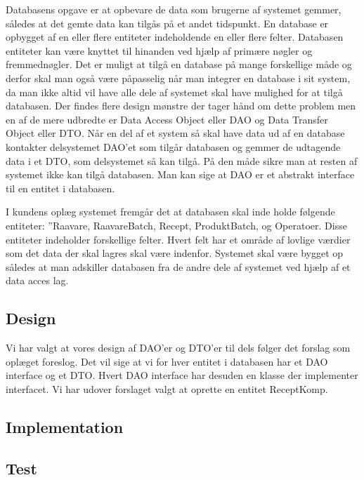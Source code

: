 \documentclass[a4paper]{article}
\begin{document}
Databasens opgave er at opbevare de data som brugerne af systemet gemmer, således at det gemte data kan tilgås på et andet tidspunkt. En database er opbygget af en eller flere entiteter indeholdende en eller flere felter. Databasen entiteter kan være knyttet til hinanden ved hjælp af primære nøgler og fremmednøgler. Det er muligt at tilgå en database på mange forskellige måde og derfor skal man også være påpasselig når man integrer en database i sit system, da man ikke altid vil have alle dele af systemet skal have mulighed for at tilgå databasen. Der findes flere design mønstre der tager hånd om dette problem men en af de mere udbredte er Data Access Object eller DAO og Data Transfer Object eller DTO. Når en del af et system så skal have data ud af en database kontakter delsystemet DAO’et som tilgår databasen og gemmer de udtagende data i et DTO, som delsystemet så kan tilgå. På den måde sikre man at resten af systemet ikke kan tilgå databasen. Man kan sige at DAO er et abstrakt interface til en entitet i databasen.

I kundens oplæg systemet fremgår det at databasen skal inde holde følgende entiteter: ”Raavare, RaavareBatch, Recept, ProduktBatch, og Operatoer. Disse entiteter indeholder forskellige felter. Hvert felt har et område af lovlige værdier som det data der skal lagres skal være indenfor.
Systemet skal være bygget op således at man adskiller databasen fra de andre dele af systemet ved hjælp af et data acces lag.



\subsection{Design} %

Vi har valgt at vores design af DAO’er og DTO’er til dels følger det forslag som oplæget foreslog. Det vil sige at vi for hver entitet i databasen har et DAO interface og et DTO. Hvert DAO interface har desuden en klasse der implementer interfacet.  Vi har udover forslaget valgt at oprette en entitet ReceptKomp. 


\subsection{Implementation} %


\subsection{Test} %
\end{document}
